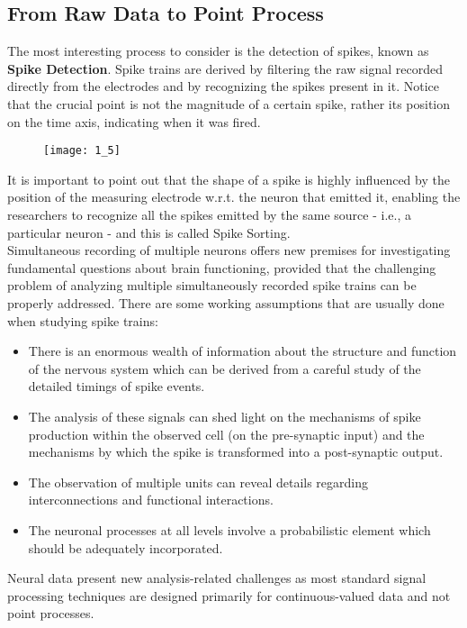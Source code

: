 \subsection{From Raw Data to Point Process}
The most interesting process to consider is the detection of
spikes, known as \textbf{Spike Detection}.
Spike trains are derived by filtering the raw signal recorded directly from the
electrodes and by recognizing the spikes present in it. Notice that the
crucial point is not the magnitude of a certain spike, rather its position
on the time axis, indicating when it was fired.
\begin{figure}[H]
      \texttt{[image: 1\_5]}
      \centering
\end{figure}
It is important to point out that the shape of a spike is highly
influenced by the position of the measuring electrode w.r.t. the neuron
that emitted it, enabling the researchers to recognize all the spikes
emitted by the same source - i.e., a
particular neuron - and this is called Spike Sorting.\\
Simultaneous recording of multiple neurons offers new premises for
investigating fundamental questions about brain functioning, provided that
the challenging problem of analyzing multiple simultaneously recorded
spike trains can be properly addressed.
There are some working assumptions that are usually done when studying
spike trains:
\begin{itemize}
      \item There is an enormous wealth of information about the structure
            and function of the nervous system which can be derived from a careful study
            of the detailed timings of spike events.
      \item The analysis of these signals can shed light on the mechanisms of
            spike production within the observed cell (on the pre-synaptic input) and
            the mechanisms by which the spike is transformed into a post-synaptic
            output.
      \item The observation of multiple units can reveal details regarding
            interconnections and functional interactions.
      \item The neuronal processes at all levels involve a probabilistic element
            which should be adequately incorporated.
\end{itemize}
Neural data present new analysis-related challenges as most standard signal
processing techniques are designed primarily for continuous-valued data
and not point processes.
